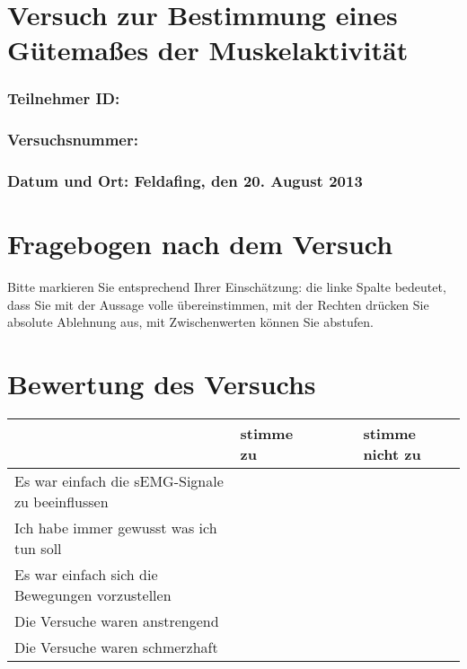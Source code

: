 \documentclass{article}
\begin{document}
\section*{Versuch zur Bestimmung eines Gütema\ss es der Muskelaktivität}

\subsubsection*{Teilnehmer ID:}
\subsubsection*{Versuchsnummer:}
\subsubsection*{Datum und Ort: Feldafing, den 20. August 2013}
\vspace{1cm}

\section*{Fragebogen nach dem Versuch}
Bitte markieren Sie entsprechend Ihrer Einschätzung: die linke Spalte bedeutet, dass Sie mit der Aussage volle \"ubereinstimmen, mit der Rechten dr\"ucken Sie absolute Ablehnung aus, mit Zwischenwerten k\"onnen Sie abstufen.


\section{Bewertung des Versuchs}

\begin{center}
  \begin{tabular}{ |p{} |  p{} | p{} | p{} | p{} | p{} |  }
    \hline
     & stimme zu & & & & stimme nicht zu \\ \hline
    Es war einfach die sEMG-Signale zu beeinflussen  & & & & &\\ \hline
	Ich habe immer gewusst was ich tun soll  & & & & &\\ \hline
    Es war einfach sich die Bewegungen vorzustellen  & & & & &\\ \hline
    Die Versuche waren anstrengend & & & & &\\ \hline
    Die Versuche waren schmerzhaft & & & & &\\ \hline
  \end{tabular}
\end{center}
\end{document}

